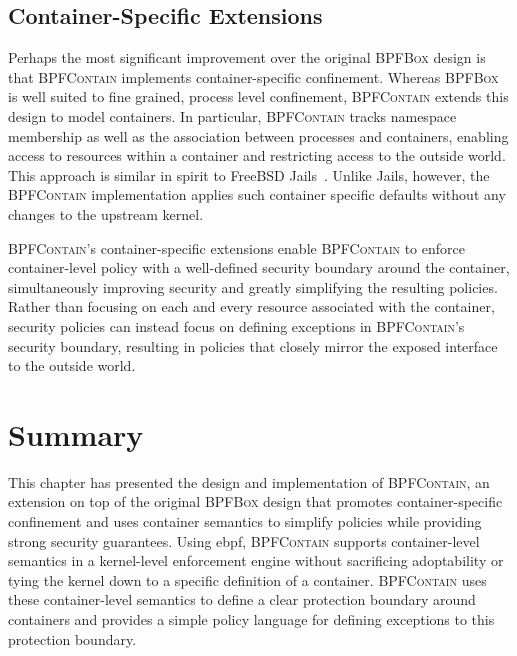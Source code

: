 \documentclass[
  fontsize=12pt,
  titlepage=firstiscover,
  paper=letter,
oneside,
  cleardoublepage=plain,
  parskip=half-,
  DIV=10,
  parindent,
  appendixprefix,
  chapterprefix,
  listof=totoc,
]{scrbook}
\newcommand{\bpfbox}{\textsc{BPFBox}}
\newcommand{\bpfcontain}{\textsc{BPFContain}}
\begin{document}
\subsection{Container-Specific Extensions}\label{ss:bpfcontain-extending}

Perhaps the most significant improvement over the original \bpfbox{} design is that
\bpfcontain{} implements container-specific confinement. Whereas \bpfbox{} is well suited
to fine grained, process level confinement, \bpfcontain{} extends this design to model
containers. In particular, \bpfcontain{} tracks namespace membership as well as the
association between processes and containers, enabling access to resources within
a container and restricting access to the outside world. This approach is similar in
spirit to FreeBSD Jails~\cite{kamp2000_jails}. Unlike Jails, however, the \bpfcontain{}
implementation applies such container specific defaults without any changes to the
upstream kernel.

\bpfcontain{}'s container-specific extensions enable \bpfcontain{} to enforce
container-level policy with a well-defined security boundary around the container,
simultaneously improving security and greatly simplifying the resulting policies. Rather
than focusing on each and every resource associated with the container, security policies
can instead focus on defining exceptions in \bpfcontain{}'s security boundary, resulting
in policies that closely mirror the exposed interface to the outside world.






\section{Summary}\label{s:bpfcontain-summary}

This chapter has presented the design and implementation of \bpfcontain{}, an extension on
top of the original \bpfbox{} design that promotes container-specific confinement and uses
container semantics to simplify policies while providing strong security guarantees.
Using \gls{ebpf}, \bpfcontain{} supports container-level semantics in a kernel-level
enforcement engine without sacrificing adoptability or tying the kernel down to a specific
definition of a container. \bpfcontain{} uses these container-level semantics to define
a clear protection boundary around containers and provides a simple policy language for
defining exceptions to this protection boundary.
\end{document}
